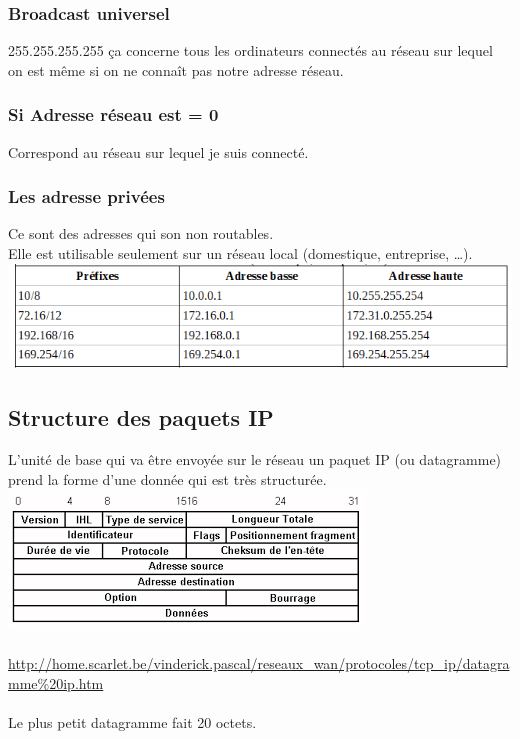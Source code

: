 \documentclass{article}
\begin{document}
\subsubsection*{Broadcast universel}
255.255.255.255
ça concerne tous les ordinateurs connectés au réseau sur lequel on est même si on ne connaît pas notre adresse réseau.
\subsubsection*{Si Adresse réseau est = 0}
Correspond au réseau sur lequel je suis connecté.

\subsubsection{Les adresse privées}
Ce sont des adresses qui son non routables. \\
Elle est utilisable seulement sur un réseau local (domestique, entreprise, …). \\
\includegraphics{adresse_pv.png}

\subsection{Structure des paquets IP}
L’unité de base qui va être envoyée sur le réseau un paquet IP (ou datagramme) prend la forme d’une donnée qui est très structurée. \\

\includegraphics{data_ip.png} \\
\\
\url{http://home.scarlet.be/vinderick.pascal/reseaux_wan/protocoles/tcp_ip/datagramme%20ip.htm} \\
\\ 
Le plus petit datagramme fait 20 octets. \\
\end{document}
